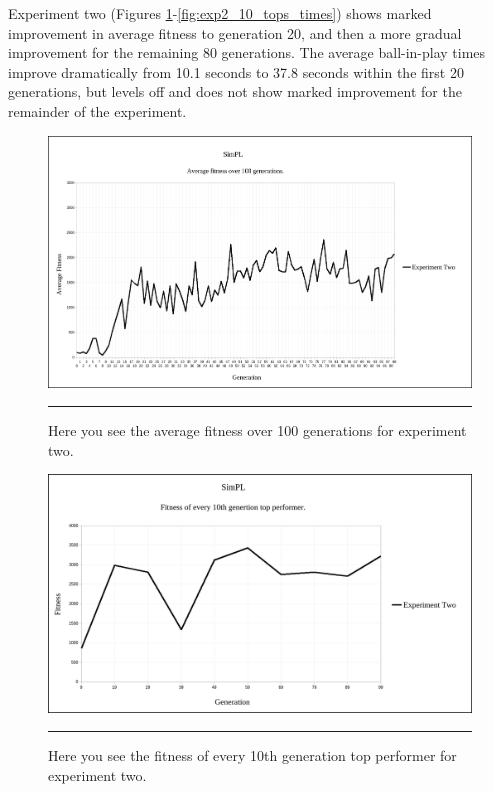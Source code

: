 Experiment two (Figures \ref{fig:exp2_avg_fit}-\ref{fig:exp2_10_tops_times}) shows marked improvement in average fitness to generation 20, and then a more gradual improvement for the remaining 80 generations. The average ball-in-play times improve dramatically from 10.1 seconds to 37.8 seconds within the first 20 generations, but levels off and does not show marked improvement for the remainder of the experiment.

\begin{figure}[htbp]  
  \centering
  \includegraphics[width=5in]{../Figures/Chapter3/exp2_avg_fit.png}
  \rule{35em}{0.5pt}
  \caption[Experiment Two Average Fitness]{Here you see the average fitness over 100 generations for experiment two.}
  \label{fig:exp2_avg_fit}
\end{figure}

\begin{figure}[htbp]  
  \centering
  \includegraphics[width=5in]{../Figures/Chapter3/exp2_10_tops.png}
  \rule{35em}{0.5pt}
  \caption[Experiment Two Top Performers]{Here you see the fitness of every 10th generation top performer for experiment two.}
  \label{fig:exp2_10_tops}
\end{figure}


